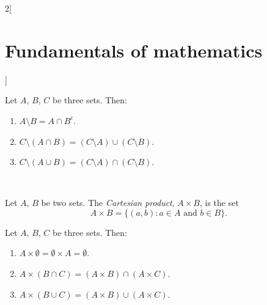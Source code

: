 \documentclass[../../../main.tex]{subfiles}
\begin{document}
\begin{multicols}{2}[\section{Fundamentals of mathematics}]
\begin{definition}
\end{definition}
\begin{prop}
    Let $A$, $B$, $C$ be three sets. Then:
    \begin{enumerate}
        \item $A\setminus B=A\cap B^c$.
        \item $C\setminus(A\cap B)=(C\setminus A)\cup (C\setminus B)$.
        \item $C\setminus(A\cup B)=(C\setminus A)\cap (C\setminus B)$.
    \end{enumerate}
\end{prop}
\begin{center}
    \hfill
    \\
    \vspace{0.02\linewidth}
    \hfill
    
\end{center}
\begin{definition}
    Let $A$, $B$ be two sets. The \textit{Cartesian product}, $A\times B$, is the set $$A\times B=\{(a,b): a\in A\text{ and }b\in B\}.$$
\end{definition}
\begin{prop}
    Let $A$, $B$, $C$ be three sets. Then:
    \begin{enumerate}
        \item $A\times \emptyset=\emptyset\times A=\emptyset$.
        \item $A\times(B\cap C)=(A\times B)\cap(A\times C)$.
        \item $A\times(B\cup C)=(A\times B)\cup(A\times C)$.
    \end{enumerate}
\end{prop}

\end{multicols}
\end{document}
